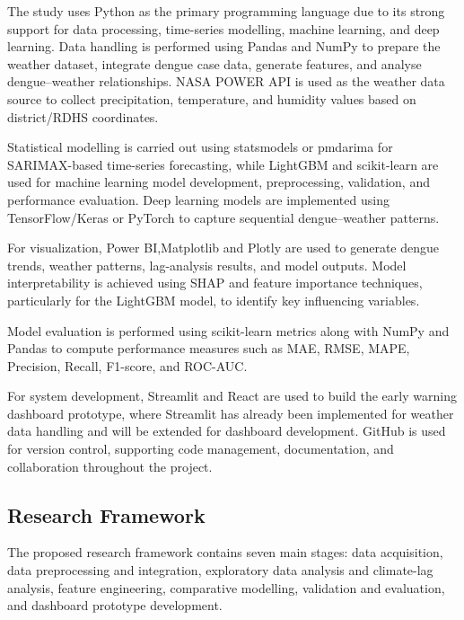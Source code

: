 \documentclass[12pt,a4paper]{article}
\begin{document}
The study uses Python as the primary programming language due to its strong support for data processing, time-series modelling, machine learning, and deep learning. Data handling is performed using Pandas and NumPy to prepare the weather dataset, integrate dengue case data, generate features, and analyse dengue–weather relationships. NASA POWER API is used as the weather data source to collect precipitation, temperature, and humidity values based on district/RDHS coordinates.

Statistical modelling is carried out using statsmodels or pmdarima for SARIMAX-based time-series forecasting, while LightGBM and scikit-learn are used for machine learning model development, preprocessing, validation, and performance evaluation. Deep learning models are implemented using TensorFlow/Keras or PyTorch to capture sequential dengue–weather patterns.

For visualization, Power BI,Matplotlib and Plotly are used to generate dengue trends, weather patterns, lag-analysis results, and model outputs. Model interpretability is achieved using SHAP and feature importance techniques, particularly for the LightGBM model, to identify key influencing variables.

Model evaluation is performed using scikit-learn metrics along with NumPy and Pandas to compute performance measures such as MAE, RMSE, MAPE, Precision, Recall, F1-score, and ROC-AUC.

For system development, Streamlit and React are used to build the early warning dashboard prototype, where Streamlit has already been implemented for weather data handling and will be extended for dashboard development. GitHub is used for version control, supporting code management, documentation, and collaboration throughout the project.

\subsection{Research Framework}

The proposed research framework contains seven main stages: data acquisition, data preprocessing and integration, exploratory data analysis and climate-lag analysis, feature engineering, comparative modelling, validation and evaluation, and dashboard prototype development.
\end{document}
